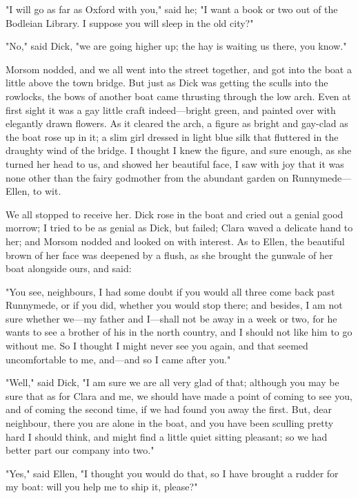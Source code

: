 "I will go as far as Oxford with you," said he; "I want a book or two
out of the Bodleian Library. I suppose you will sleep in the old city?"

"No," said Dick, "we are going higher up; the hay is waiting us there,
you know."

Morsom nodded, and we all went into the street together, and got into
the boat a little above the town bridge. But just as Dick was getting
the sculls into the rowlocks, the bows of another boat came thrusting
through the low arch. Even at first sight it was a gay little craft
indeed---bright green, and painted over with elegantly drawn flowers. As
it cleared the arch, a figure as bright and gay-clad as the boat rose up
in it; a slim girl dressed in light blue silk that fluttered in the
draughty wind of the bridge. I thought I knew the figure, and sure
enough, as she turned her head to us, and showed her beautiful face, I
saw with joy that it was none other than the fairy godmother from the
abundant garden on Runnymede---Ellen, to wit.

We all stopped to receive her. Dick rose in the boat and cried out a
genial good morrow; I tried to be as genial as Dick, but failed; Clara
waved a delicate hand to her; and Morsom nodded and looked on with
interest. As to Ellen, the beautiful brown of her face was deepened by a
flush, as she brought the gunwale of her boat alongside ours, and said:

"You see, neighbours, I had some doubt if you would all three come back
past Runnymede, or if you did, whether you would stop there; and
besides, I am not sure whether we---my father and I---shall not be away
in a week or two, for he wants to see a brother of his in the north
country, and I should not like him to go without me. So I thought I
might never see you again, and that seemed uncomfortable to me,
and---and so I came after you."

"Well," said Dick, "I am sure we are all very glad of that; although you
may be sure that as for Clara and me, we should have made a point of
coming to see you, and of coming the second time, if we had found you
away the first. But, dear neighbour, there you are alone in the boat,
and you have been sculling pretty hard I should think, and might find a
little quiet sitting pleasant; so we had better part our company into
two."

"Yes," said Ellen, "I thought you would do that, so I have brought a
rudder for my boat: will you help me to ship it, please?"

